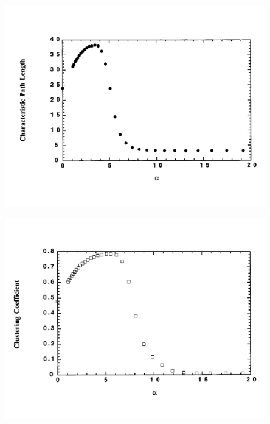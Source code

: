 \documentclass[aspectratio=169]{beamer}
\begin{document}
\begin{frame}

\begin{center}
\includegraphics[width = 0.85\textwidth]{figures/watts_networks_1999_fig3}
\end{center}

\end{frame}
\begin{frame}

\begin{center}
\includegraphics[width = 0.85\textwidth]{figures/watts_networks_1999_fig4}
\end{center}

\end{frame}
\end{document}
